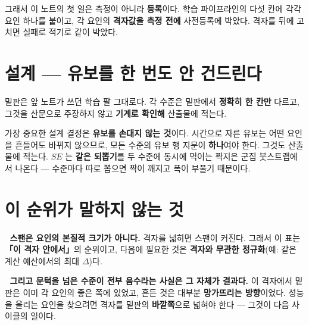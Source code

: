 \documentclass[10pt]{article}
\begin{document}
그래서 이 노트의 첫 일은 측정이 아니라 \textbf{등록}이다.
학습 파이프라인의 다섯 칸에 각각 요인 하나를 붙이고,
각 요인의 \textbf{격자값을 측정 전에} 사전등록에 박았다.
격자를 뒤에 고치면 실패로 적기로 같이 박았다.

\section{설계 --- 유보를 한 번도 안 건드린다}

밑판은 앞 노트가 쓰던 학습 팔 그대로다. 각 수준은 밑판에서 \textbf{정확히 한 칸만} 다르고,
그것을 산문으로 주장하지 않고 \textbf{기계로 확인해} 산출물에 적는다.

가장 중요한 설계 결정은 \textbf{유보를 손대지 않는 것}이다.
시간으로 자른 유보는 어떤 요인을 흔들어도 바뀌지 않으므로,
모든 수준의 유보 행 지문이 \textbf{하나}여야 한다. 그것도 산출물에 적는다.
$SE$ 는 \textbf{같은 되뽑기}를 두 수준에 동시에 먹이는 짝지은 군집 붓스트랩에서 나온다 ---
수준마다 따로 뽑으면 짝이 깨지고 폭이 부풀기 때문이다.



\section{이 순위가 말하지 않는 것}

🔴 \textbf{스팬은 요인의 본질적 크기가 아니다.} 격자를 넓히면 스팬이 커진다.
그래서 이 표는 \textbf{「이 격자 안에서」}의 순위이고, 다음에 필요한 것은
\textbf{격자와 무관한 정규화}(예: 같은 계산 예산에서의 최대 $\Delta$)다.

🔴 \textbf{그리고 문턱을 넘은 수준이 전부 음수라는 사실은 그 자체가 결과다.}
이 격자에서 밑판은 이미 각 요인의 좋은 쪽에 있었고,
흔든 것은 대부분 \textbf{망가뜨리는 방향}이었다. 성능을 올리는 요인을 찾으려면
격자를 밑판의 \textbf{바깥쪽}으로 넓혀야 한다 --- 그것이 다음 사이클의 일이다.
\end{document}
